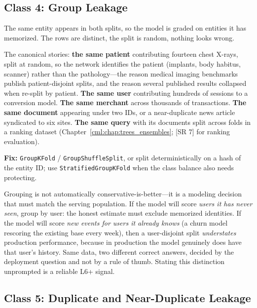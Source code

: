 \subsection{Class 4: Group Leakage}

The same entity appears in both splits, so the model is graded on entities it has memorized. The rows are distinct, the split is random, nothing looks wrong.

The canonical stories: \textbf{the same patient} contributing fourteen chest X-rays, split at random, so the network identifies the patient (implants, body habitus, scanner) rather than the pathology---the reason medical imaging benchmarks publish patient-disjoint splits, and the reason several published results collapsed when re-split by patient. \textbf{The same user} contributing hundreds of sessions to a conversion model. \textbf{The same merchant} across thousands of transactions. \textbf{The same document} appearing under two IDs, or a near-duplicate news article syndicated to six sites. \textbf{The same query} with its documents split across folds in a ranking dataset (Chapter~\ref{cml:chap:trees_ensembles}; [SR 7] for ranking evaluation).

\textbf{Fix:} \texttt{GroupKFold} / \texttt{GroupShuffleSplit}, or split deterministically on a hash of the entity ID; use \texttt{StratifiedGroupKFold} when the class balance also needs protecting.

\begin{keyinsight}
Grouping is not automatically conservative-is-better---it is a modeling decision that must match the serving population. If the model will score \emph{users it has never seen}, group by user: the honest estimate must exclude memorized identities. If the model will score \emph{new events for users it already knows} (a churn model rescoring the existing base every week), then a user-disjoint split \emph{understates} production performance, because in production the model genuinely does have that user's history. Same data, two different correct answers, decided by the deployment question and not by a rule of thumb. Stating this distinction unprompted is a reliable L6+ signal.
\end{keyinsight}

\subsection{Class 5: Duplicate and Near-Duplicate Leakage}


